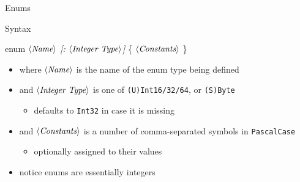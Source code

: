 \documentclass[presentation]{beamer}
\newcommand{\cscat}[1]{$\langle\text{{\itshape#1}}\rangle$}
\newcommand{\csopt}[1]{{\itshape[#1]}}
\begin{document}
\begin{frame}[allowframebreaks]{Enums}
  \begin{block}{Syntax}
    \begin{center}\ttfamily
      enum \cscat{Name} \csopt{: \cscat{Integer Type}} \{ \cscat{Constants} \}
    \end{center}
    \begin{itemize}
      \item where \texttt{\cscat{Name}} is the name of the enum type being defined
      \item and \texttt{\cscat{Integer Type}} is one of \texttt{(U)Int16/32/64}, or \texttt{(S)Byte}
      \begin{itemize}
        \item defaults to \texttt{Int32} in case it is missing
      \end{itemize}
      \item and \cscat{Constants} is a number of comma-separated symbols in \texttt{PascalCase}
      \begin{itemize}
        \item optionally assigned to their values
      \end{itemize}
    \end{itemize}
  \end{block}

  \begin{itemize}
    \item notice enums are essentially integers
  \end{itemize}
\end{frame}
\end{document}
